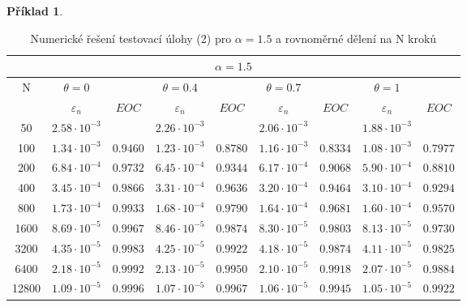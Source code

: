 \documentclass[a4paper,12pt,twoside]{article}
\theoremstyle{definition}
\newtheorem{prikl}[veta]{Příklad}
\theoremstyle{remark}
\numberwithin{equation}{section}
\numberwithin{table}{section}
\numberwithin{figure}{section}
\begin{document}
\begin{prikl}
	\begin{table}[h!]
		\centering
		\caption{Numerické řešení testovací úlohy (2) pro $\alpha = 1.5$ a rovnoměrné dělení na N kroků}
		\label{tab:tabulkaTestovacíÚloha(2),alpha=1.5}
	\begin{tabular}{|c||cc|cc|cc|cc|}
		\hline
		\multicolumn{9}{|c|}{$\alpha = 1.5$} \\
		\hline
		 N 	  & $\theta = 0$ & & $\theta = 0.4$ && $\theta = 0.7$ & &$\theta = 1$& \\
		\hline
		      & $\varepsilon_{n}$    & $EOC$    & $\varepsilon_{n}$    &$EOC$   & $\varepsilon_{n}$    &$EOC$    &$\varepsilon_{n}$    &$EOC$ \\
		50 	  & $2.58 \cdot 10^{-3}$ & 		    & $2.26 \cdot 10^{-3}$ &		& $2.06 \cdot 10^{-3}$ & 	     &$1.88 \cdot 10^{-3}$& \\
		\hline
		100   & $1.34 \cdot 10^{-3}$ & $0.9460$ & $1.23 \cdot 10^{-3}$ &$0.8780$& $1.16 \cdot 10^{-3}$ &$0.8334$ &$1.08 \cdot 10^{-3}$&$0.7977$ \\
		\hline
		200   & $6.84 \cdot 10^{-4}$ & $0.9732$ & $6.45 \cdot 10^{-4}$ &$0.9344$& $6.17 \cdot 10^{-4}$ &$0.9068$ &$5.90 \cdot 10^{-4}$&$0.8810$\\
		\hline
		400   & $3.45 \cdot 10^{-4}$ & $0.9866$ & $3.31 \cdot 10^{-4}$ &$0.9636$& $3.20 \cdot 10^{-4}$ &$0.9464$ &$3.10 \cdot 10^{-4}$&$0.9294$ \\
		\hline
		800   & $1.73 \cdot 10^{-4}$ & $0.9933$ & $1.68 \cdot 10^{-4}$ &$0.9790$& $1.64 \cdot 10^{-4}$ &$0.9681$ &$1.60 \cdot 10^{-4}$&$0.9570$ \\
		\hline
		1600  & $8.69 \cdot 10^{-5}$ & $0.9967$ & $8.46 \cdot 10^{-5}$ &$0.9874$& $8.30 \cdot 10^{-5}$ &$0.9803$ &$8.13 \cdot 10^{-5}$&$0.9730$ \\
		\hline
		3200  & $4.35 \cdot 10^{-5}$ & $0.9983$ & $4.25 \cdot 10^{-5}$ &$0.9922$& $4.18 \cdot 10^{-5}$ &$0.9874$ &$4.11 \cdot 10^{-5}$&$0.9825$ \\
		\hline
		6400  & $2.18 \cdot 10^{-5}$ & $0.9992$ & $2.13 \cdot 10^{-5}$ &$0.9950$& $2.10 \cdot 10^{-5}$ &$0.9918$ &$2.07 \cdot 10^{-5}$&$0.9884$ \\
		\hline
		12800 & $1.09 \cdot 10^{-5}$ & $0.9996$ & $1.07 \cdot 10^{-5}$ &$0.9967$& $1.06 \cdot 10^{-5}$ &$0.9945$ &$1.05 \cdot 10^{-5}$&$0.9922$ \\
		\hline
	\end{tabular}
	\end{table}


\end{prikl}
\end{document}
